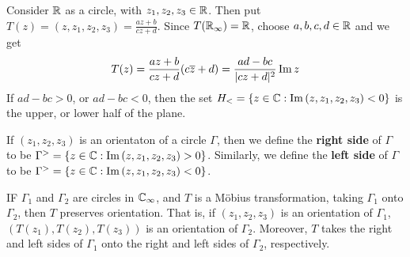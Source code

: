 \begin{example}\label{example_3.10}
    Consider $\mathbb{R}$ as a circle, with  $z_1,z_2,z_3 \in \mathbb{R}$. Then put
    $T(z)=(z,z_1,z_2,z_3)=\frac{az+b}{cz+d}$. Since $T(\mathbb{R}_\infty)=\mathbb{R}$, choose
    $a,b,c,d \in \mathbb{R}$ and we get
    \begin{equation*}
        T(z)=\frac{az+b}{cz+d}(c\overline{z}+d)=\frac{ad-bc}{|cz+d|^2}\operatorname{Im}{z}
    \end{equation*}
    If $ad-bc>0$, or  $ad-bc<0$, then the set  $H_<=\{z \in \mathbb{C} :
    \operatorname{Im}{(z,z_1,z_2,z_3)<0}\}$ is the upper, or lower half of the plane.
\end{example}

\begin{definition}
    If $(z_1,z_2,z_3)$ is an orientaton of a circle $\Gamma$, then we define the
     \textbf{right side} of $\Gamma$ to be $\Gamma^>=\{z \in \mathbb{C} :
     \operatorname{Im}{(z,z_1,z_2,z_3)}>0\}$. Similarly, we define the \textbf{left side} of
     $\Gamma$ to be $\Gamma^>=\{z \in \mathbb{C} : \operatorname{Im}{(z,z_1,z_2,z_3)}<0\}$.
\end{definition}

\begin{theorem}\label{3.3.11}
    IF $\Gamma_1$ and $\Gamma_2$ are circles in $\mathbb{C}_\infty$, and  $T$ is a
    M\"obius transformation, taking  $\Gamma_1$ onto $\Gamma_2$, then $T$
    preserves orientation. That is, if  $(z_1,z_2,z_3)$ is an orientation of
    $\Gamma_1$, $(T(z_1),T(z_2),T(z_3))$ is an orientation of $\Gamma_2$.
    Moreover, $T$ takes the right and left sides of  $\Gamma_1$ onto the right
    and left sides of $\Gamma_2$, respectively.
\end{theorem}

